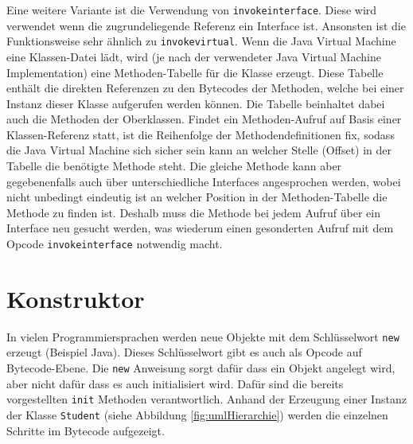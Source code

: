 \documentclass[conference]{IEEEtran}
\begin{document}
Eine weitere Variante ist die Verwendung von \verb|invokeinterface|. Diese wird verwendet wenn die zugrundeliegende Referenz ein Interface ist. Ansonsten ist die Funktionsweise sehr ähnlich zu \verb|invokevirtual|. Wenn die Java Virtual Machine eine Klassen-Datei lädt, wird (je nach der verwendeter Java Virtual Machine Implementation) eine Methoden-Tabelle für die Klasse erzeugt. Diese Tabelle enthält die direkten Referenzen zu den Bytecodes der Methoden, welche bei einer Instanz dieser Klasse aufgerufen werden können. Die Tabelle beinhaltet dabei auch die Methoden der Oberklassen. Findet ein Methoden-Aufruf auf Basis einer Klassen-Referenz statt, ist die Reihenfolge der Methodendefinitionen fix, sodass die Java Virtual Machine sich sicher sein kann an welcher Stelle (Offset) in der Tabelle die benötigte Methode steht. Die gleiche Methode kann aber gegebenenfalls auch über unterschiedliche Interfaces angesprochen werden, wobei nicht unbedingt eindeutig ist an welcher Position in der Methoden-Tabelle die Methode zu finden ist. Deshalb muss die Methode bei jedem Aufruf über ein Interface neu gesucht werden, was wiederum einen gesonderten Aufruf mit dem Opcode \verb|invokeinterface| notwendig macht.\cite{Venners.1997}

\section{Konstruktor}
In vielen Programmiersprachen werden neue Objekte mit dem Schlüsselwort \verb|new| erzeugt (Beispiel Java). Dieses Schlüsselwort gibt es auch als Opcode auf Bytecode-Ebene. Die \verb|new| Anweisung sorgt dafür dass ein Objekt angelegt wird, aber nicht dafür dass es auch initialisiert wird. Dafür sind die bereits vorgestellten \verb|init| Methoden verantwortlich. Anhand der Erzeugung einer Instanz der Klasse \verb|Student| (siehe Abbildung \ref{fig:umlHierarchie}) werden die einzelnen Schritte im Bytecode aufgezeigt.
\end{document}
